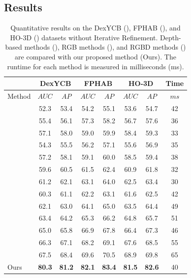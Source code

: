 \subsection{Results}

\begin{table}[h]
\caption{Quantitative results on the DexYCB (\cite{chao2021dexycb}), FPHAB (\cite{garcia2018first}), and HO-3D (\cite{hampali2020honnotate}) datasets without Iterative Refinement. Depth-based methods (\cite{wang20216d, gao20206d, guo2021efficient}), RGB methods (\cite{billings2019silhonet, peng2019pvnet, wang2021gdr, castro2023crt}), and RGBD methods (\cite{wang2019densefusion, he2020pvn3d, he2021ffb6d, wu2023geometric, hong2024rdpn6d, lin2024hipose}) are compared with our proposed method (Ours). The runtime for each method is measured in milliseconds (ms).}
\label{tab:dataset_without_ir}
\begin{center}
\begin{tabular}{|l|c|c|c|c|c|c|c|} 
\hline
& \multicolumn{2}{c|}{DexYCB} & \multicolumn{2}{c|}{FPHAB} & \multicolumn{2}{c|}{HO-3D} & Time \\
\hline
Method & $AUC$ & $AP$ & $AUC$ & $AP$ & $AUC$ & $AP$ & $ms$ \\  
\hline 
\cite{wang20216d} & 52.3 & 53.4 & 54.2 & 55.1 & 53.6 & 54.7 & 42 \\
\cite{gao20206d} & 55.4 & 56.1 & 57.3 & 58.2 & 56.7 & 57.6 & 36 \\
\cite{guo2021efficient} & 57.1 & 58.0 & 59.0 & 59.9 & 58.4 & 59.3 & 33 \\
\hline 
\cite{billings2019silhonet} & 54.3 & 55.5 & 56.2 & 57.1 & 55.6 & 56.9 & 35 \\
\cite{peng2019pvnet} & 57.2 & 58.1 & 59.1 & 60.0 & 58.5 & 59.4 & 38 \\
\cite{wang2021gdr} & 59.6 & 60.5 & 61.5 & 62.4 & 60.9 & 61.8 & 32 \\
\cite{castro2023crt} & 61.2 & 62.1 & 63.1 & 64.0 & 62.5 & 63.4 & 30 \\
\hline
\cite{wang2019densefusion} & 60.3 & 61.1 & 62.2 & 63.1 & 61.6 & 62.5 & 42 \\
\cite{he2020pvn3d} & 62.1 & 63.0 & 64.1 & 65.0 & 63.5 & 64.4 & 49 \\
\cite{he2021ffb6d} & 63.4 & 64.2 & 65.3 & 66.2 & 64.8 & 65.7 & 51 \\
\cite{wu2023geometric} & 65.0 & 65.8 & 66.9 & 67.8 & 66.4 & 67.3 & 46 \\
\cite{hong2024rdpn6d} & 66.3 & 67.1 & 68.2 & 69.1 & 67.6 & 68.5 & 55 \\
\cite{lin2024hipose} & 67.5 & 68.4 & 69.6 & 70.5 & 68.9 & 69.8 & 65 \\
Ours & \textbf{80.3} & \textbf{81.2} & \textbf{82.1} & \textbf{83.4} & \textbf{81.5} & \textbf{82.6} & 40 \\
\hline
\end{tabular}
\end{center}
\end{table}


